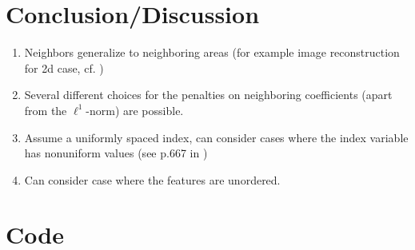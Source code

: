 \documentclass{article}
\theoremstyle{definition}
\begin{document}
\section{Conclusion/Discussion}

\begin{enumerate}
	\item Neighbors generalize to neighboring areas  (for example image reconstruction for 2d case, cf. \citep{sparsity})
	\item Several different choices for the penalties on neighboring coefficients (apart from the $\ell^1$-norm) are possible.
	\item Assume a uniformly spaced index, can consider cases where the index variable has nonuniform values (see p.667 in \citep{sparsity})
	\item Can consider case where the features are unordered.
\end{enumerate}
 
 \citep{elements}

\appendix

\newpage

\section{Code}
\end{document}
